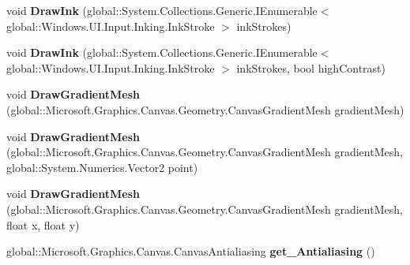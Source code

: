 \begin{DoxyCompactItemize}
\item 
\mbox{\label{class_microsoft_1_1_graphics_1_1_canvas_1_1_canvas_drawing_session_acfbfbd4b3a3c2452d280fe9995b664b5}} 
void {\bfseries Draw\+Ink} (global\+::\+System.\+Collections.\+Generic.\+I\+Enumerable$<$ global\+::\+Windows.\+U\+I.\+Input.\+Inking.\+Ink\+Stroke $>$ ink\+Strokes)
\item 
\mbox{\label{class_microsoft_1_1_graphics_1_1_canvas_1_1_canvas_drawing_session_ac9670075cd7d03e36032cfa2ec5be7be}} 
void {\bfseries Draw\+Ink} (global\+::\+System.\+Collections.\+Generic.\+I\+Enumerable$<$ global\+::\+Windows.\+U\+I.\+Input.\+Inking.\+Ink\+Stroke $>$ ink\+Strokes, bool high\+Contrast)
\item 
\mbox{\label{class_microsoft_1_1_graphics_1_1_canvas_1_1_canvas_drawing_session_acf46c3a66def149f54e2c2cbc75af600}} 
void {\bfseries Draw\+Gradient\+Mesh} (global\+::\+Microsoft.\+Graphics.\+Canvas.\+Geometry.\+Canvas\+Gradient\+Mesh gradient\+Mesh)
\item 
\mbox{\label{class_microsoft_1_1_graphics_1_1_canvas_1_1_canvas_drawing_session_a6725dffba5937e6088ddbc6132d69550}} 
void {\bfseries Draw\+Gradient\+Mesh} (global\+::\+Microsoft.\+Graphics.\+Canvas.\+Geometry.\+Canvas\+Gradient\+Mesh gradient\+Mesh, global\+::\+System.\+Numerics.\+Vector2 point)
\item 
\mbox{\label{class_microsoft_1_1_graphics_1_1_canvas_1_1_canvas_drawing_session_a304f85a9e137c9f1190e83693361bae7}} 
void {\bfseries Draw\+Gradient\+Mesh} (global\+::\+Microsoft.\+Graphics.\+Canvas.\+Geometry.\+Canvas\+Gradient\+Mesh gradient\+Mesh, float x, float y)
\item 
\mbox{\label{class_microsoft_1_1_graphics_1_1_canvas_1_1_canvas_drawing_session_ace70b6710e7b5968f6cb715842e62a5a}} 
global\+::\+Microsoft.\+Graphics.\+Canvas.\+Canvas\+Antialiasing {\bfseries get\+\_\+\+Antialiasing} ()
\item 

\end{DoxyCompactItemize}
